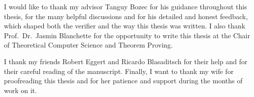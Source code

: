 \thispagestyle{empty}

\vspace*{20mm}

\begin{center}
\makeatletter

{}
{}
\makeatother
\end{center}

\vspace{10mm}

\noindent
I would like to thank my advisor Tanguy Bozec for his guidance throughout this thesis, for the many helpful discussions and for his detailed and honest feedback, which shaped both the verifier and the way this thesis was written.
I also thank Prof.\ Dr.\ Jasmin Blanchette for the opportunity to write this thesis at the Chair of Theoretical Computer Science and Theorem Proving.

\medskip
\noindent
I thank my friends Robert Eggert and Ricardo Blasaditsch for their help and for their careful reading of the manuscript.
Finally, I want to thank my wife for proofreading this thesis and for her patience and support during the months of work on it.

\cleardoublepage{}